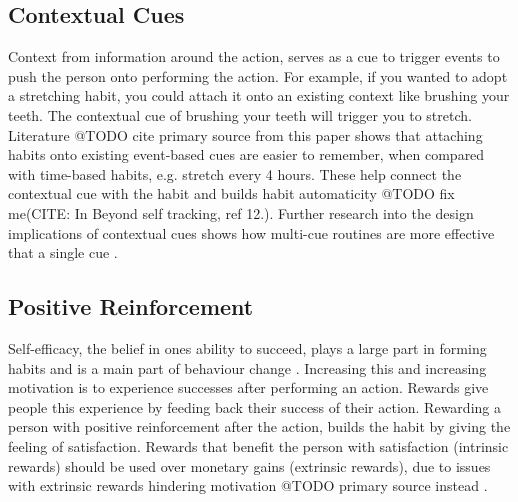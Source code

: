 \subsection*{Contextual Cues}
Context from information around the action, serves as a cue to trigger events to push the person onto performing the action. For example, if you wanted to adopt a stretching habit, you could attach it onto an existing context like brushing your teeth. The contextual cue of brushing your teeth will trigger you to stretch. Literature @TODO cite primary source from this paper \cite{article_beyond_self_tracking_designing_apps} shows that attaching habits onto existing event-based cues are easier to remember, when compared with time-based habits, e.g. stretch every 4 hours. These help connect the contextual cue with the habit and builds habit automaticity @TODO fix me(CITE: In Beyond self tracking, ref 12.). Further research into the design implications of contextual cues shows how multi-cue routines are more effective that a single cue \cite{article_understanding_use_contextual_cues_design_impl}.

\subsection*{Positive Reinforcement}
Self-efficacy, the belief in ones ability to succeed, plays a large part in forming habits and is a main part of behaviour change \cite{article_a_self_efficacy}. Increasing this and increasing motivation is to experience successes after performing an action. Rewards give people this experience by feeding back their success of their action.\newline
\newline
Rewarding a person with positive reinforcement after the action, builds the habit by giving the feeling of satisfaction. Rewards that benefit the person with satisfaction (intrinsic rewards) should be used over monetary gains (extrinsic rewards), due to issues with extrinsic rewards hindering motivation @TODO primary source instead \cite{article_beyond_self_tracking_designing_apps}.


